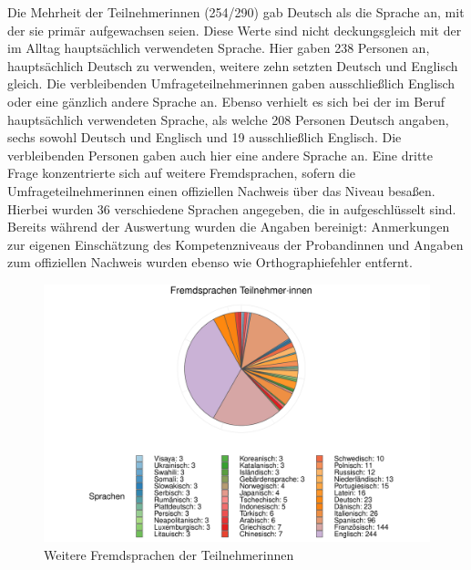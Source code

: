 
Die Mehrheit der Teilnehmer{\textperiodcentered}innen (254/290) gab Deutsch als die Sprache an, mit der sie primär aufgewachsen seien. Diese Werte sind nicht deckungsgleich mit der im Alltag hauptsächlich verwendeten Sprache. Hier gaben 238 Personen an, hauptsächlich Deutsch zu verwenden, weitere zehn setzten Deutsch und Englisch gleich. Die verbleibenden Umfrageteilnehmer{\textperiodcentered}innen gaben ausschließlich Englisch oder eine gänzlich andere Sprache an. Ebenso verhielt es sich bei der im Beruf hauptsächlich verwendeten Sprache, als welche 208 Personen Deutsch angaben, sechs sowohl Deutsch und Englisch und 19 ausschließlich Englisch. Die verbleibenden Personen gaben auch hier eine andere Sprache an. Eine dritte Frage konzentrierte sich auf weitere Fremdsprachen, sofern die Umfrageteilnehmer{\textperiodcentered}innen einen offiziellen Nachweis über das Niveau besaßen. Hierbei wurden 36 verschiedene Sprachen angegeben, die in  aufgeschlüsselt sind. Bereits während der Auswertung wurden die Angaben bereinigt: Anmerkungen zur eigenen Einschätzung des Kompetenzniveaus der Proband{\textperiodcentered}innen und Angaben zum offiziellen Nachweis wurden ebenso wie Orthographiefehler entfernt.


\begin{figure}
		\includegraphics[width=\textwidth]{Figures/Umfrage/GGplot/ggplot_sprachen_TN-Umfrage}
	\caption{Weitere Fremdsprachen der Teilnehmer{\textperiodcentered}innen\label{K6:fig:Fremdsprachen-Umfrage}}
\end{figure}

